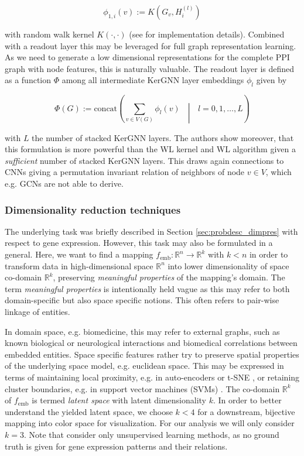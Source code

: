 \documentclass[]{article}
\renewcommand{\cite}{\citep}
\begin{document}
\begin{equation}
	\phi_{1,i}(v) := K\left(G_v, H_i^{(l)}\right)
\end{equation}

with random walk kernel $K(\cdot, \cdot)$ (see \citet{feng2022kergnns} for implementation details). Combined with a readout layer this may be leveraged for full graph representation learning. As we need to generate a low dimensional representations for the complete PPI graph with node features, this is naturally valuable. The readout layer is defined as a function $\Phi$ among all intermediate KerGNN layer embeddings $\phi_l$ given by 

\begin{equation}
	\label{equ:KerGNN}
	\Phi(G):= \text{concat}\left( \sum_{v\in V(G)} \phi_l(v) \text{ }\middle|\text{ } l=0,1,\dots, L \right)
\end{equation} 

with $L$ the number of stacked KerGNN layers. The authors show moreover, that this formulation is more powerful than the WL kernel and WL algorithm given a \textit{sufficient} number of stacked KerGNN layers. This draws again connections to CNNs giving a permutation invariant relation of neighbors of node $v\in V$, which e.g. GCNs are not able to derive. 


\subsubsection{Dimensionality reduction techniques}
\label{sec:dim_red}

The underlying task was briefly described in Section \ref{sec:probdesc_dimpres} with respect to gene expression. However, this task may also be formulated in a general. Here, we want to find a mapping $f_\text{emb}:\mathbb{R}^n\rightarrow \mathbb{R}^k$ with $k<n$ in order to transform data in high-dimensional space $\mathbb{R}^n$ into lower dimensionality of space co-domain $\mathbb{R}^k$, preserving \textit{meaningful properties} of the mapping's domain. The term \textit{meaningful properties} is intentionally held vague as this may refer to both domain-specific but also space specific notions. This often refers to pair-wise linkage of entities.

In domain space, e.g. biomedicine, this may refer to external graphs, such as known biological or neurological interactions and biomedical correlations between embedded entities. Space specific features rather try to preserve spatial properties of the underlying space model, e.g. euclidean space. This may be expressed in terms of maintaining local proximity, e.g. in auto-encoders \cite{ng2011sparse} or t-SNE \cite{van2008visualizing}, or retaining cluster boundaries, e.g. in support vector machines (SVMs) \cite{noble2006support}. The co-domain $\mathbb{R}^k$ of $f_\text{emb}$ is termed \textit{latent space} with latent dimensionality $k$.
In order to better understand the yielded latent space, we choose $k<4$ for a downstream, bijective mapping into color space for visualization. For our analysis we will only consider $k=3$. Note that consider only unsupervised learning methods, as no ground truth is given for gene expression patterns and their relations.\\
\end{document}
